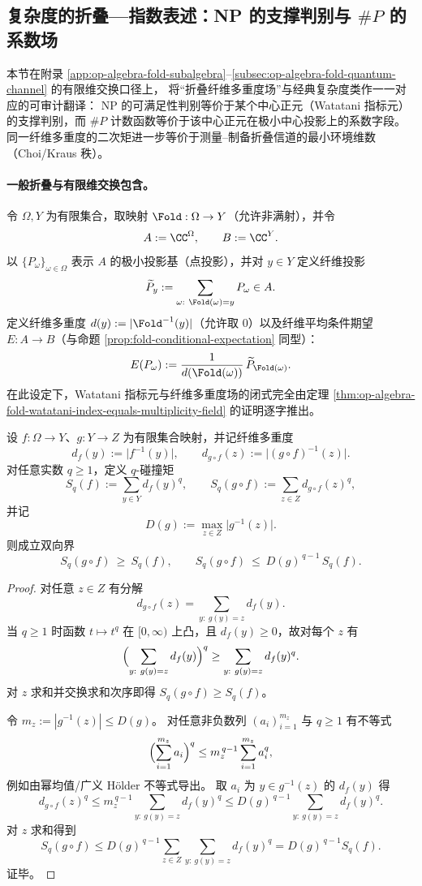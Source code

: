 %
\subsection{复杂度的折叠—指数表述：NP 的支撑判别与 \texorpdfstring{$\#P$}{\#P} 的系数场}\label{subsec:op-algebra-complexity-watatani-index-support}
本节在附录 \ref{app:op-algebra-fold-subalgebra}--\ref{subsec:op-algebra-fold-quantum-channel} 的有限维交换口径上，
将“折叠纤维多重度场”与经典复杂度类作一一对应的可审计翻译：
NP 的可满足性判别等价于某个中心正元（Watatani 指标元）的支撑判别，而 \(\#P\) 计数函数等价于该中心正元在极小中心投影上的系数字段。
同一纤维多重度的二次矩进一步等价于测量--制备折叠信道的最小环境维数（Choi/Kraus 秩）。

\paragraph{一般折叠与有限维交换包含。}
令 \(\Omega,Y\) 为有限集合，取映射 \(\Fold:\Omega\to Y\)（允许非满射），并令
\[
A:=\CC^{\Omega},\qquad B:=\CC^{Y}.
\]
以 \(\{P_\omega\}_{\omega\in\Omega}\) 表示 \(A\) 的极小投影基（点投影），并对 \(y\in Y\) 定义纤维投影
\[
\widetilde P_y:=\sum_{\omega:\ \Fold(\omega)=y}P_\omega\in A.
\]
定义纤维多重度 \(d(y):=|\Fold^{-1}(y)|\)（允许取 \(0\)）以及纤维平均条件期望 \(E:A\to B\)（与命题 \ref{prop:fold-conditional-expectation} 同型）：
\[
E(P_\omega):=\frac{1}{d(\Fold(\omega))}\,\widetilde P_{\Fold(\omega)}.
\]
在此设定下，Watatani 指标元与纤维多重度场的闭式完全由定理 \ref{thm:op-algebra-fold-watatani-index-equals-multiplicity-field} 的证明逐字推出。

\begin{proposition}\label{prop:op-algebra-coarsegraining-sq-two-sided}
设 \(f:\Omega\to Y\)、\(g:Y\to Z\) 为有限集合映射，并记纤维多重度
\[
d_f(y):=\bigl|f^{-1}(y)\bigr|,
\qquad
d_{g\circ f}(z):=\bigl|(g\circ f)^{-1}(z)\bigr|.
\]
对任意实数 \(q\ge 1\)，定义 \(q\)-碰撞矩
\[
S_q(f):=\sum_{y\in Y} d_f(y)^q,
\qquad
S_q(g\circ f):=\sum_{z\in Z} d_{g\circ f}(z)^q,
\]
并记
\[
D(g):=\max_{z\in Z}\bigl|g^{-1}(z)\bigr|.
\]
则成立双向界
\[
S_q(g\circ f)\ \ge\ S_q(f),
\qquad
S_q(g\circ f)\ \le\ D(g)^{\,q-1}\,S_q(f).
\]
\end{proposition}
\begin{proof}
对任意 \(z\in Z\) 有分解
\[
d_{g\circ f}(z)=\sum_{y:\ g(y)=z} d_f(y).
\]
当 \(q\ge 1\) 时函数 \(t\mapsto t^q\) 在 \([0,\infty)\) 上凸，且 \(d_f(y)\ge 0\)，故对每个 \(z\) 有
\[
\Bigl(\sum_{y:\ g(y)=z} d_f(y)\Bigr)^q \ge \sum_{y:\ g(y)=z} d_f(y)^q.
\]
对 \(z\) 求和并交换求和次序即得 \(S_q(g\circ f)\ge S_q(f)\)。
\par
令 \(m_z:=|g^{-1}(z)|\le D(g)\)。
对任意非负数列 \((a_i)_{i=1}^{m_z}\) 与 \(q\ge 1\) 有不等式
\[
\Bigl(\sum_{i=1}^{m_z} a_i\Bigr)^q \le m_z^{\,q-1}\sum_{i=1}^{m_z}a_i^q,
\]
例如由幂均值/广义 Hölder 不等式导出。
取 \(a_i\) 为 \(y\in g^{-1}(z)\) 的 \(d_f(y)\) 得
\[
d_{g\circ f}(z)^q
\le m_z^{\,q-1}\sum_{y:\ g(y)=z} d_f(y)^q
\le D(g)^{\,q-1}\sum_{y:\ g(y)=z} d_f(y)^q.
\]
对 \(z\) 求和得到
\[
S_q(g\circ f)\le D(g)^{\,q-1}\sum_{z\in Z}\sum_{y:\ g(y)=z} d_f(y)^q
=D(g)^{\,q-1}S_q(f).
\]
证毕。
\end{proof}

